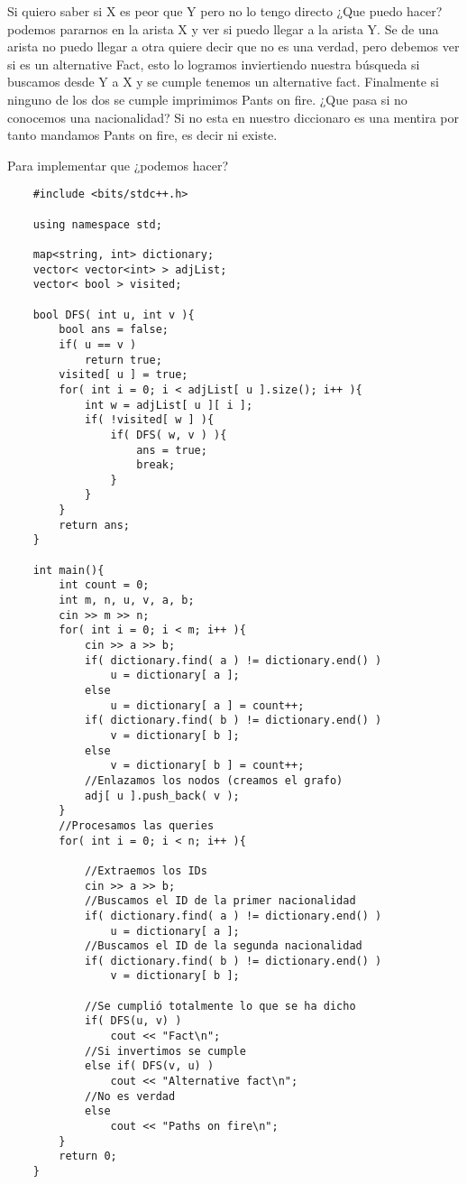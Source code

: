 Si quiero saber si X es peor que Y pero no lo tengo directo ¿Que puedo hacer? podemos pararnos en la arista X y ver si puedo llegar a la arista Y. \break 
Se de una arista no puedo llegar a otra quiere decir que no es una verdad, pero debemos ver si es un alternative Fact, esto lo logramos inviertiendo nuestra búsqueda si buscamos desde Y a X y se cumple tenemos un alternative fact.\break 
Finalmente si ninguno de los dos se cumple imprimimos Pants on fire. \break 
¿Que pasa si no conocemos una nacionalidad? Si no esta en nuestro diccionaro es una mentira por tanto mandamos Pants on fire, es decir ni existe. \break 

Para implementar que ¿podemos hacer?

\begin{lstlisting}
    #include <bits/stdc++.h>

    using namespace std;

    map<string, int> dictionary;
    vector< vector<int> > adjList;
    vector< bool > visited;
    
    bool DFS( int u, int v ){
        bool ans = false;
        if( u == v )
            return true;
        visited[ u ] = true;
        for( int i = 0; i < adjList[ u ].size(); i++ ){
            int w = adjList[ u ][ i ];
            if( !visited[ w ] ){
                if( DFS( w, v ) ){
                    ans = true;
                    break;
                }
            }
        }
        return ans;
    }

    int main(){
        int count = 0;
        int m, n, u, v, a, b;
        cin >> m >> n;
        for( int i = 0; i < m; i++ ){
            cin >> a >> b;
            if( dictionary.find( a ) != dictionary.end() )
                u = dictionary[ a ];
            else 
                u = dictionary[ a ] = count++;
            if( dictionary.find( b ) != dictionary.end() )
                v = dictionary[ b ];
            else 
                v = dictionary[ b ] = count++;
            //Enlazamos los nodos (creamos el grafo)
            adj[ u ].push_back( v );
        }
        //Procesamos las queries
        for( int i = 0; i < n; i++ ){

            //Extraemos los IDs 
            cin >> a >> b;
            //Buscamos el ID de la primer nacionalidad
            if( dictionary.find( a ) != dictionary.end() )
                u = dictionary[ a ];
            //Buscamos el ID de la segunda nacionalidad
            if( dictionary.find( b ) != dictionary.end() )
                v = dictionary[ b ];

            //Se cumplió totalmente lo que se ha dicho
            if( DFS(u, v) )
                cout << "Fact\n";
            //Si invertimos se cumple
            else if( DFS(v, u) )
                cout << "Alternative fact\n";
            //No es verdad
            else 
                cout << "Paths on fire\n";
        }
        return 0;
    }
\end{lstlisting}


